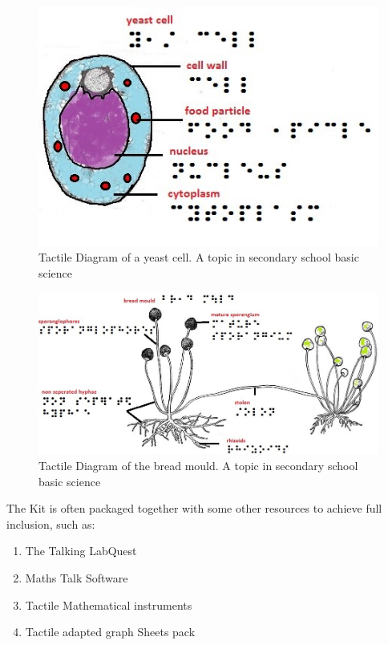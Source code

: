 \documentclass[11.5pt]{sig-alternate} %
\begin{document}
\begin{large}
\begin{figure}[h]
    \centering
    \includegraphics[width=1\linewidth]{images/fig3.jpg}
    \caption{Tactile Diagram of a yeast cell. A topic in secondary school basic science}
\end{figure}
\begin{figure}[h]
    \centering
    \includegraphics[width=1\linewidth]{images/fig4.jpg}
    \caption{Tactile Diagram of the bread mould. A topic in secondary school basic science}
\end{figure}

The Kit is often packaged together with some other resources to achieve full inclusion, such as:

\begin{enumerate}
    \item The Talking LabQuest
    \item Maths Talk Software
    \item Tactile Mathematical instruments
    \item Tactile adapted graph Sheets pack
\end{enumerate}


\end{large}
\end{document}
